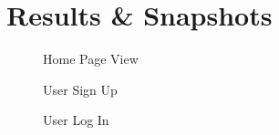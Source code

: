 \chapter{Results \& Snapshots}
\begin{figure}[H]
    \centering
    \qquad
    \caption{Home Page View}%
    \centering
\end{figure}

\begin{figure}[H]
    \centering
    \qquad
    \caption{User Sign Up}%
    \centering
\end{figure}

\begin{figure}[H]
    \centering
    \qquad
    \caption{User Log In}%
    \centering
\end{figure}


